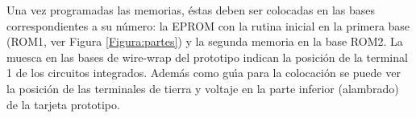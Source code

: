 Una vez programadas las memorias, \'estas deben ser colocadas en las bases correspondientes a su %
n\'umero: la EPROM con la rutina inicial en la primera base (ROM1, ver Figura %
\ref{Figura:partes}) y la segunda memoria en la base ROM2. La muesca en las bases de wire-wrap %
del prototipo indican la posici\'on de la terminal 1 de los circuitos integrados. Adem\'as como %
gu\'{\i}a para la colocaci\'on se puede ver la posici\'on de las terminales de tierra y %
voltaje en la parte inferior (alambrado) de la tarjeta prototipo.

